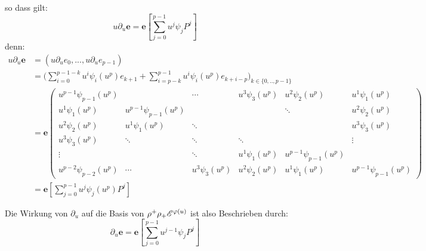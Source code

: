 so dass gilt:
\[ u\partial_u\mathbf{e}=\mathbf{e}[\sum_{j=0}^{p-1}u^j\psi_jP^j] \]
denn:\\
\begin{align*}
  u\partial_u\mathbf{e} &= (u\partial_ue_0,...,u\partial_ue_{p-1})\\
  &= \Bigg(\sum_{i=0}^{p-1-k}u^i\psi_i(u^p)e_{k+1} +
    \sum_{i=p-k}^{p-1}u^i\psi_i(u^p)e_{k+i-p}\Bigg)_{k\in\{0,..,p-1\}}\\
  &= \mathbf{e}
  \begin{pmatrix}u^{p-1}\psi_{p-1}(u^p) &  & \cdots & u^{3}\psi_{3}(u^p) & u^{2}
    \psi_{2}(u^p) & u^{1}\psi_{1}(u^p)\\
    u^{1}\psi_{1}(u^p) & u^{p-1}\psi_{p-1}(u^p) &  &  
    & \ddots & u^{2}\psi_{2}(u^p)\\
    u^{2}\psi_{2}(u^p) & u^{1}\psi_{1}(u^p) & \ddots &  &  & u^{3}\psi_{3}(u^p)\\
    u^{3}\psi_{3}(u^p) & \ddots & \ddots & \ddots &  & \vdots\\
    \vdots &  & \ddots & u^{1}\psi_{1}(u^p) & u^{p-1}\psi_{p-1}(u^p)\\
    u^{p-2}\psi_{p-2}(u^p) & \cdots & u^{3}\psi_{3}(u^p) & u^{2}\psi_{2}(u^p) &
    u^{1}\psi_{1}(u^p) & u^{p-1}\psi_{p-1}(u^p)
  \end{pmatrix}\\
  &= \mathbf{e}[\sum_{j=0}^{p-1}u^j\psi_j(u^p)P^j]
\end{align*}


Die Wirkung von $\partial_u$ auf die Basis von $\rho^+\rho_+{\mathscr E}^{\varphi(u)}$ ist
also Beschrieben durch:
\[ \partial_u\mathbf{e}=\mathbf{e}[\sum_{j=0}^{p-1}u^{j-1}\psi_jP^j] \]

